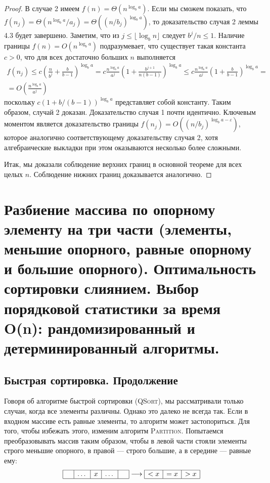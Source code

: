 \documentclass[a4paper,12pt]{article}
\begin{document}
\begin{proof}
	 В случае 2 имеем $f(n) = \Theta(n^{\log_b a})$.
	 Если мы сможем показать, что $f(n_j) = \Theta(n^{\log_b a}/a_j) = \Theta((n/b_j)^{\log_b a})$, то 
	 доказательство случая 2 леммы 4.3 будет завершено. Заметим, что из $j \leqslant \lfloor \log_b n \rfloor$
	 следует $b^j/n \leqslant 1$. Наличие границы $f(n) = O(n^{\log_b a})$ подразумевает, что 
	 существует такая константа $c > 0$, что для всех достаточно больших $n$ выполняется
	 \begin{multline*}
	 	f(n_j) \leqslant c\left(\frac{n}{b^j} + \frac{b}{b - 1}\right)^{\log_b a} = c\frac{n^{\log_b a}}{a^j}\left(1 + \frac{b^{j + 1}}{n(b -1)}\right)^{\log_b a} \leqslant c\frac{n^{\log_b a}}{a^j}\left(1 + \frac{b}{b -1}\right)^{\log_b a} = \\ = O\left(\frac{n^{\log_b a}}{a^j}\right)
	 \end{multline*}
	 поскольку $c(1 + b/(b - 1))^{\log_b a}$ представляет собой константу. Таким образом, случай 2 доказан. Доказательство случая 1 почти идентично. Ключевым моментом является доказательство границы $f(n_j) = O((n/b_j)^{\log_b a - \varepsilon})$, которое аналогично соответствующему доказательству случая 2, хотя алгебраические выкладки при
	 этом оказываются несколько более сложными.
	 
	 Итак, мы доказали соблюдение верхних границ в основной теореме для всех целых $n$. Соблюдение нижних границ доказывается аналогично.
\end{proof}

\newpage
\section{Разбиение массива по опорному элементу на три части (элементы, меньшие опорного, равные опорному и большие опорного). Оптимальность сортировки слиянием. Выбор порядковой статистики за время O(n): рандомизированный и детерминированный алгоритмы.}

\subsection{Быстрая сортировка. Продолжение}
Говоря об алгоритме быстрой сортировки (\textsc{QSort}), мы рассматривали только случаи, когда все элементы различны. Однако это далеко не всегда так. Если в входном массиве есть равные элементы, то алгоритм может застопориться. Для того, чтобы избежать этого, изменим алгоритм \textsc{Partition}. Попытаемся преобразовывать массив таким образом, чтобы в левой части стояли элементы строго меньшие опорного, в правой --- строго большие, а в середине --- равные ему:
\[\begin{array}{|c|c|c|c|c|}
	\hline
	\phantom{x}  & \dots & x & \dots & \phantom{x}  \\
	\hline
\end{array}
\longrightarrow
\begin{array}{|c|c|c|}
    \hline
    <x&=x&>x\\
    \hline
\end{array}\]
\end{document}
